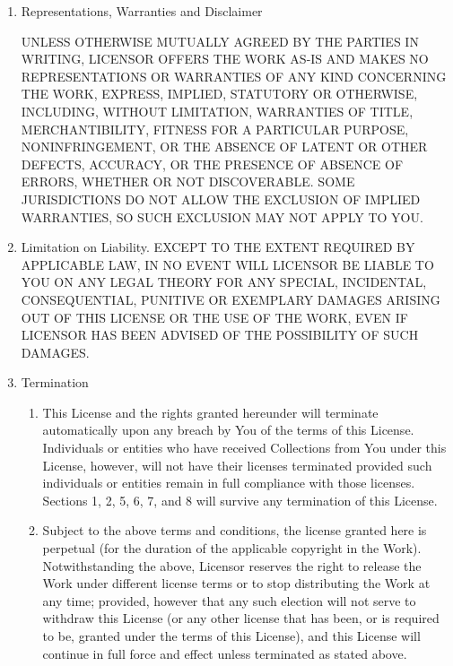 \begin{enumerate}
\begin{enumerate}
        \end{enumerate}

    \item Representations, Warranties and Disclaimer

UNLESS OTHERWISE MUTUALLY AGREED BY THE PARTIES IN WRITING, LICENSOR OFFERS THE
WORK AS-IS AND MAKES NO REPRESENTATIONS OR WARRANTIES OF ANY KIND CONCERNING
THE WORK, EXPRESS, IMPLIED, STATUTORY OR OTHERWISE, INCLUDING, WITHOUT
LIMITATION, WARRANTIES OF TITLE, MERCHANTIBILITY, FITNESS FOR A PARTICULAR
PURPOSE, NONINFRINGEMENT, OR THE ABSENCE OF LATENT OR OTHER DEFECTS, ACCURACY,
OR THE PRESENCE OF ABSENCE OF ERRORS, WHETHER OR NOT DISCOVERABLE. SOME
JURISDICTIONS DO NOT ALLOW THE EXCLUSION OF IMPLIED WARRANTIES, SO SUCH
EXCLUSION MAY NOT APPLY TO YOU.

    \item Limitation on Liability. EXCEPT TO THE EXTENT REQUIRED BY APPLICABLE
        LAW, IN NO EVENT WILL LICENSOR BE LIABLE TO YOU ON ANY LEGAL THEORY FOR
        ANY SPECIAL, INCIDENTAL, CONSEQUENTIAL, PUNITIVE OR EXEMPLARY DAMAGES
        ARISING OUT OF THIS LICENSE OR THE USE OF THE WORK, EVEN IF LICENSOR
        HAS BEEN ADVISED OF THE POSSIBILITY OF SUCH DAMAGES.

    \item Termination

        \begin{enumerate}

            \item This License and the rights granted hereunder will terminate
                automatically upon any breach by You of the terms of this
                License. Individuals or entities who have received Collections
                from You under this License, however, will not have their
                licenses terminated provided such individuals or entities
                remain in full compliance with those licenses. Sections 1, 2,
                5, 6, 7, and 8 will survive any termination of this License.
            
            \item Subject to the above terms and conditions, the license
                granted here is perpetual (for the duration of the applicable
                copyright in the Work). Notwithstanding the above, Licensor
                reserves the right to release the Work under different license
                terms or to stop distributing the Work at any time; provided,
                however that any such election will not serve to withdraw this
                License (or any other license that has been, or is required to
                be, granted under the terms of this License), and this License
                will continue in full force and effect unless terminated as
                stated above.


\end{enumerate}
\end{enumerate}

